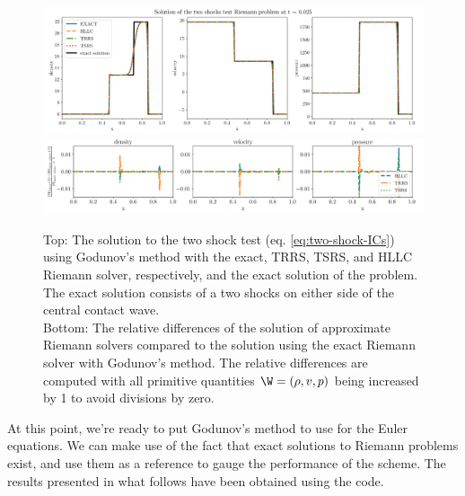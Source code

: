 \begin{figure}
    \centering
    \includegraphics[width=\textwidth]{
    ./figures/FV/godunov_euler/GODUNOV-two_shocks-1D.png} %
    \includegraphics[width=\textwidth]{
    ./figures/FV/godunov_euler/GODUNOV-two_shocks-differences-1D.png} %
    \caption[Two shocks solution using Godunov's method]{
Top: The solution to the two shock test (eq. \ref{eq:two-shock-ICs}) using Godunov's method with
the exact, TRRS, TSRS, and HLLC Riemann solver, respectively, and the exact solution of the problem.
The exact solution consists of a two shocks on either side of the central contact wave. \\
Bottom: The relative differences of the solution of approximate Riemann solvers compared to the
solution using the exact Riemann solver with Godunov's method. The relative differences are
computed with all primitive quantities $\W = (\rho, v, p)$ being increased by 1 to avoid
divisions by zero.
    }%
    \label{fig:godunov-two-shocks}
\end{figure}





At this point, we're ready to put Godunov's method to use for the Euler equations. We can
make use of the fact that exact solutions to Riemann problems exist, and use them as a reference to
gauge the performance of the scheme. The results presented in what follows have been obtained using
the \meshhydro code.

